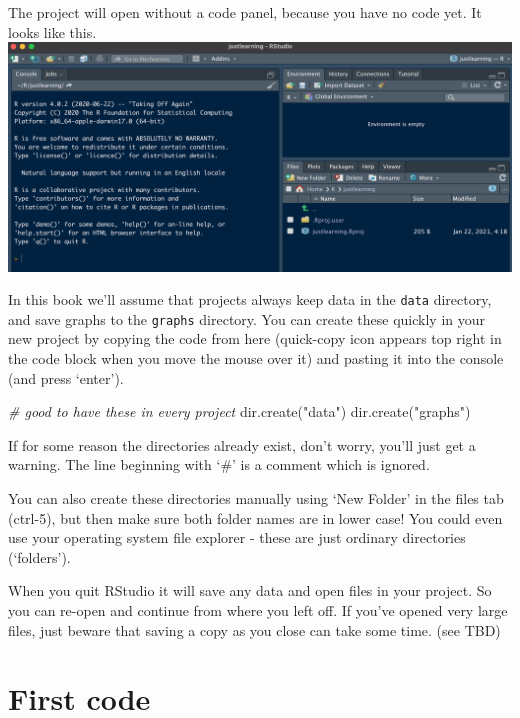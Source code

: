 \documentclass[
]{book}
\newenvironment{Shaded}{\begin{snugshade}}{\end{snugshade}}
\newcommand{\CommentTok}[1]{\textcolor[rgb]{0.56,0.35,0.01}{\textit{#1}}}
\newcommand{\FunctionTok}[1]{\textcolor[rgb]{0.00,0.00,0.00}{#1}}
\newcommand{\NormalTok}[1]{#1}
\newcommand{\StringTok}[1]{\textcolor[rgb]{0.31,0.60,0.02}{#1}}
\begin{document}
The project will open without a code panel, because you have no code yet. It looks like this.
\includegraphics{images/NewJustLearning.png}

In this book we'll assume that projects always keep data in the \texttt{data} directory, and save graphs to the \texttt{graphs} directory. You can create these quickly in your new project by copying the code from here (quick-copy icon appears top right in the code block when you move the mouse over it) and pasting it into the console (and press `enter').

\begin{Shaded}
\begin{Highlighting}[]
\CommentTok{\# good to have these in every project}
\FunctionTok{dir.create}\NormalTok{(}\StringTok{"data"}\NormalTok{)}
\FunctionTok{dir.create}\NormalTok{(}\StringTok{"graphs"}\NormalTok{)}
\end{Highlighting}
\end{Shaded}

If for some reason the directories already exist, don't worry, you'll just get a warning. The line beginning with `\#' is a comment which is ignored.

You can also create these directories manually using `New Folder' in the files tab (ctrl-5), but then make sure both folder names are in lower case! You could even use your operating system file explorer - these are just ordinary directories (`folders').

When you quit RStudio it will save any data and open files in your project. So you can re-open and continue from where you left off. If you've opened very large files, just beware that saving a copy as you close can take some time. (see TBD)

\hypertarget{first-code}{%
\section{First code}\label{first-code}}
\end{document}
